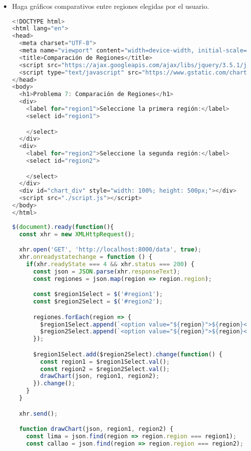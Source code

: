 \documentclass{article}
\begin{document}
\begin{itemize}
            \item Haga gráficos comparativos entre regiones elegidas por el usuario.
            
            \begin{lstlisting}[language=JavaScript, caption=PROBLEMA7-INDEX]
<!DOCTYPE html>
<html lang="en">
<head>
  <meta charset="UTF-8">
  <meta name="viewport" content="width=device-width, initial-scale=1.0">
  <title>Comparación de Regiones</title>
  <script src="https://ajax.googleapis.com/ajax/libs/jquery/3.5.1/jquery.min.js"></script>
  <script type="text/javascript" src="https://www.gstatic.com/charts/loader.js"></script>
</head>
<body>
  <h1>Problema 7: Comparación de Regiones</h1>
  <div>
    <label for="region1">Seleccione la primera región:</label>
    <select id="region1">

    </select>
  </div>
  <div>
    <label for="region2">Seleccione la segunda región:</label>
    <select id="region2">

    </select>
  </div>
  <div id="chart_div" style="width: 100%; height: 500px;"></div>
  <script src="./script.js"></script>
</body>
</html>
            \end{lstlisting}  

            \begin{lstlisting}[language=JavaScript, caption=PROBLEMA7-SCRIPT]
$(document).ready(function(){
  const xhr = new XMLHttpRequest(); 

  xhr.open('GET', 'http://localhost:8000/data', true);
  xhr.onreadystatechange = function () {
    if(xhr.readyState === 4 && xhr.status === 200) {
      const json = JSON.parse(xhr.responseText);
      const regiones = json.map(region => region.region);

      const $region1Select = $('#region1');
      const $region2Select = $('#region2');

      regiones.forEach(region => {
        $region1Select.append(`<option value="${region}">${region}</option>`);
        $region2Select.append(`<option value="${region}">${region}</option>`);
      });

      $region1Select.add($region2Select).change(function() {
        const region1 = $region1Select.val();
        const region2 = $region2Select.val();
        drawChart(json, region1, region2);
      }).change(); 
    }
  }

  xhr.send();

  function drawChart(json, region1, region2) {
    const lima = json.find(region => region.region === region1);
    const callao = json.find(region => region.region === region2);


\end{lstlisting}
\end{itemize}
\end{document}

